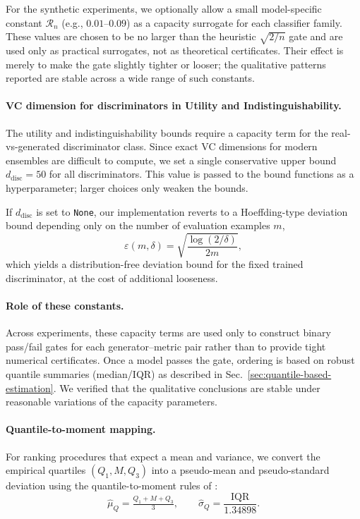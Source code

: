 For the synthetic experiments, we optionally allow a small model-specific constant $\mathcal{R}_n$ (e.g., $0.01$--$0.09$) as a capacity surrogate for each classifier family. These values are chosen to be no larger than the heuristic $\sqrt{2/n}$ gate and are used only as practical surrogates, not as theoretical certificates. Their effect is merely to make the gate slightly tighter or looser; the qualitative patterns reported are stable across a wide range of such constants.

\paragraph{VC dimension for discriminators in Utility and Indistinguishability.}
The utility and indistinguishability bounds require a capacity term for the real-vs-generated discriminator class. Since exact VC dimensions for modern ensembles are difficult to compute, we set a single conservative upper bound $d_{\mathrm{disc}} = 50$ for all discriminators. This value is passed to the bound functions as a hyperparameter; larger choices only weaken the bounds.

If $d_{\mathrm{disc}}$ is set to \texttt{None}, our implementation reverts to a Hoeffding-type deviation bound depending only on the number of evaluation examples $m$,
\[
  \varepsilon(m, \delta)
  = \sqrt{\frac{\log(2/\delta)}{2m}},
\]
which yields a distribution-free deviation bound for the fixed trained discriminator, at the cost of additional looseness.

\paragraph{Role of these constants.}
Across experiments, these capacity terms are used only to construct binary pass/fail gates for each generator--metric pair rather than to provide tight numerical certificates. Once a model passes the gate, ordering is based on robust quantile summaries (median/IQR) as described in Sec.~\ref{sec:quantile-based-estimation}. We verified that the qualitative conclusions are stable under reasonable variations of the capacity parameters.

\paragraph{Quantile-to-moment mapping.}
For ranking procedures that expect a mean and variance, we convert the empirical quartiles $(Q_1,M,Q_3)$ into a pseudo-mean and pseudo-standard deviation using the quantile-to-moment rules of \citet{wan2016estimatingsamplemeanstandard}:
\[
\hat{\mu}_Q = \tfrac{Q_1 + M + Q_3}{3},
\qquad
\hat{\sigma}_Q = \frac{\mathrm{IQR}}{1.34898}.
\]

